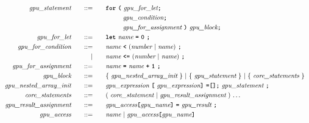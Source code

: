\begin{alignat*}{9}
    && \textit{gpu\_statement} 
    &&\quad ::= &\quad 
    && \textbf{\texttt{for}}\ \textbf{\texttt{(}} 
                              \ \textit{gpu\_for\_let} \textbf{\texttt{;}} \\
    &&  &&     &\quad && \ \ \ \ \ \ \ \  \textit{gpu\_condition} \textbf{\texttt{;}} \\
    &&  &&     &\quad && \ \ \ \ \ \ \ \  \textit{gpu\_for\_assignment} \ \textbf{\texttt{)}}  \ \textit{gpu\_block} \textbf{\texttt{;}} \\
    && \textit{gpu\_for\_let} 
    &&\quad ::= &\quad 
    && \textbf{\texttt{let}}\  \textit{name} \ 
                                               \textbf{\texttt{=}}\  \textbf{\texttt{0}} \ \textbf{\texttt{;}} \\
    && \textit{gpu\_for\_condition} 
    &&\quad ::= &\quad 
    && \textit{name} \ 
    \textbf{\texttt{<}}\  (\textit{number} \ | \ \textit{name})\ \textbf{\texttt{;}} \\
    &&  && |    &\quad && \textit{name} \ \textbf{\texttt{<=}}\  (\textit{number} \ | \ \textit{name})\ \textbf{\texttt{;}} \\
    && \textit{gpu\_for\_assignment} 
    &&\quad ::= &\quad 
    && \textit{name} \ \textbf{\texttt{=}}\  \textit{name} \  \textbf{\texttt{+}} \ \textbf{\texttt{1}} \  \textbf{\texttt{;}} \\
    && \textit{gpu\_block} 
    &&\quad ::= &\quad 
    && \{ \ \textit{gpu\_nested\_array\_init} \ \} \ | \ \{ \ \textit{gpu\_statement} \ \} \ | \ \{ \ \textit{core\_statements} \ \} \\
    && \textit{gpu\_nested\_array\_init} 
    &&\quad ::= &\quad     
    && \textit{gpu\_expression} \ \textbf{\texttt{[}} \ \textit{gpu\_expression} \textbf{\texttt{]}} \ \textbf{\texttt{=[];}} \ \textit{gpu\_statement} \ \textbf{\texttt{;}} \\
    && \textit{core\_statements} 
    &&\quad ::= &\quad 
    && ( \ \textit{core\_statement} \ | \ \textit{gpu\_result\_assignment} \ ) \ {\ldots} \\
    && \textit{gpu\_result\_assignment} 
    &&\quad ::= &\quad 
    && \textit{gpu\_access} \textbf{\texttt{[}} \textit{gpu\_name} \textbf{\texttt{]}}\ \textbf{\texttt{=}}\  \textit{gpu\_result} \ \textbf{\texttt{;}} \\
    && \textit{gpu\_access} 
    &&\quad ::= &\quad && \textit{name} \ | \
    \textit{gpu\_access} \textbf{\texttt{[}} \textit{gpu\_name} \textbf{\texttt{]}}\ \\

\end{alignat*}
